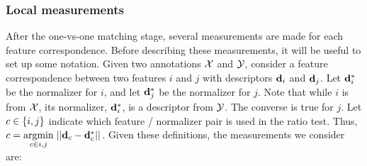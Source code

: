 \subsubsection{Local measurements}
After the one-vs-one matching stage, several measurements are made for each feature correspondence.
Before describing these measurements, it will be useful to set up some notation.
Given two annotations $\mathcal{X}$ and $\mathcal{Y}$, consider a feature correspondence between two features $i$ and $j$
  with descriptors $\mathbf{d}_i$ and $\mathbf{d}_j$.
Let $\mathbf{d}^{*}_i$ be the normalizer for $i$, and let $\mathbf{d}^{*}_j$ be the normalizer for $j$.
Note that while $i$ is from $\mathcal{X}$, its normalizer, $\mathbf{d}^{*}_i$, is a descriptor from $\mathcal{Y}$.
The converse is true for $j$.
Let $c \in \left\{i, j\right\}$ indicate which feature / normalizer pair is used in the ratio test. %
Thus, $c = \underset{c \in {i, j}}{\operatorname{argmin}}\;{||\mathbf{d}_c - \mathbf{d}^{*}_c||_{}}$.
Given these definitions, the measurements we consider are:

